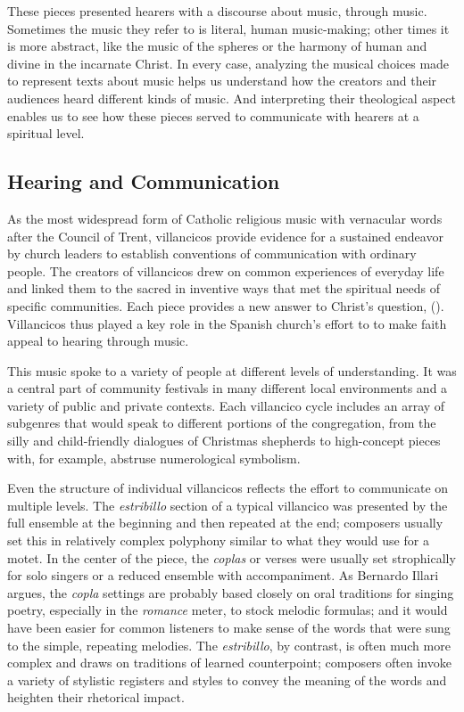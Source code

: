 These pieces presented hearers with a discourse about music, through music.
Sometimes the music they refer to is literal, human music-making; other times
it is more abstract, like the music of the spheres or the harmony of human and
divine in the incarnate Christ.
In every case, analyzing the musical choices made to represent texts about
music helps us understand how the creators and their audiences heard different
kinds of music.
And interpreting their theological aspect enables us to see how these pieces
served to communicate with hearers at a spiritual level.

\subsection{Hearing and Communication}

As the most widespread form of Catholic religious music with vernacular words
after the Council of Trent, villancicos provide evidence for a sustained
endeavor by church leaders to establish conventions of communication with
ordinary people.
The creators of villancicos drew on common experiences of everyday life and
linked them to the sacred in inventive ways that met the spiritual needs of
specific communities.
Each piece provides a new answer to Christ's question, 
().
Villancicos thus played a key role in the Spanish church's effort to to make
faith appeal to hearing through music.

This music spoke to a variety of people at different levels of understanding.
It was a central part of community festivals in many different local
environments and a variety of public and private contexts. 
Each villancico cycle includes an array of subgenres that would speak to
different portions of the congregation, from the silly and child-friendly
dialogues of Christmas shepherds to high-concept pieces with, for
example, abstruse numerological symbolism.

Even the structure of individual villancicos reflects the effort to communicate
on multiple levels.
The \emph{estribillo} section of a typical villancico was presented by the full
ensemble at the beginning and then repeated at the end; composers usually set
this in relatively complex polyphony similar to what they would use for a
motet.
In the center of the piece, the \emph{coplas} or verses were usually set
strophically for solo singers or a reduced ensemble with accompaniment.
As Bernardo Illari argues, the \emph{copla} settings are probably based closely
on oral traditions for singing poetry, especially in the \emph{romance} meter,
to stock melodic formulas; and it would have been easier for common listeners to
make sense of the words that were sung to the simple, repeating melodies.%
    \Autocite{Illari:Polychoral}
The \emph{estribillo}, by contrast, is often much more complex and draws on
traditions of learned counterpoint; composers often invoke a variety of
stylistic registers and styles to convey the meaning of the words and heighten
their rhetorical impact.


